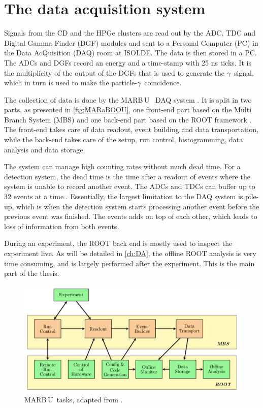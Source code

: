 \documentclass[twoside,english]{uiofysmaster/uiofysmaster}
\newcommand{\ga}{$\gamma$}
\newcommand{\MBOU}{MAR\belowbaseline[-2pt]{a}B\stackinset{l}{3pt}{b}{-3pt}{O}{O}\,U}
\let\orgautoref\autoref
\renewcommand{\autoref}
        {%
		 \def\sectionautorefname{Section}%
		 \def\subsectionautorefname{Section}%
		 \def\subsubsectionautorefname{Section}%
		 \def\chapterautorefname{Chapter}%
          \orgautoref}
\begin{document}
\section{The data acquisition system}
Signals from the CD and the HPGe clusters are read out by the ADC, TDC and Digital Gamma Finder (DGF) modules and sent to a Personal Computer (PC) in the Data AcQuisition (DAQ) room at ISOLDE. 
The data is then stored in a PC. 
The ADCs and DGFs record an energy and a time-stamp with 25 ns ticks. 
It is the multiplicity of the output of the DGFs that is used to generate the \ga\ signal, which in turn is used to make the particle-\ga\ coincidence.

The collection of data is done by the \MBOU\ \cite{Maraboou, Maraboou-web} DAQ system \cite{MB-spect}. 
It is split in two parts, as presented in \autoref{fig:MARaBOOU}, one front-end part based on the Multi Branch System (MBS) \cite{MBS} and one back-end part based on the ROOT framework \cite{ROOT}.
The front-end takes care of data readout, event building and data transportation, while the back-end takes care of the setup, run control, histogramming, data analysis and data storage. 

The system can manage high counting rates without much dead time. 
For a detection system, the dead time is the time after a readout of events where the system is unable to record another event. 
The ADCs and TDCs can buffer up to 32 events at a time \cite{MB-spect}. 
Essentially, the largest limitation to the DAQ system is pile-up, which is when the detection system starts processing another event before the previous event was finished. 
The events adds on top of each other, which leads to loss of information from both events.

During an experiment, the ROOT back end is mostly used to inspect the experiment live. 
As will be detailed in \autoref{ch:DA}, the offline ROOT analysis is very time consuming, and is largely performed after the experiment. 
This is the main part of the thesis.

\begin{figure}[ht]
	\centering
	\includegraphics[width=\linewidth]{Images/MARaBOOU.png}
	\caption{\protect\MBOU\ tasks, adapted from \cite{Maraboou}.}
	\label{fig:MARaBOOU}
\end{figure}
\end{document}
